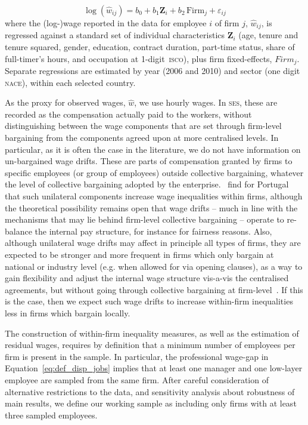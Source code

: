 \documentclass[12pt]{article}
\begin{document}
\begin{equation}
\label{eq:mincer}
\log \left( \hat{w}_{ij} \right) = 
    b_0 + b_1 \bm{Z}_{i} + b_2\, \mathrm{Firm}_j + \varepsilon_{ij}
\end{equation}
where the (log-)wage reported in the data for employee $i$ of firm
$j$, $\hat{w}_{ij}$, is regressed against a standard set of individual
characteristics $\bm{Z}_{i}$ (age, tenure and tenure squared, gender,
education, contract duration, part-time status, share of full-timer's
hours, and occupation at 1-digit~\textsc{isco}), plus firm
fixed-effects, $Firm_j$. Separate regressions are estimated
by year (2006 and 2010) and sector (one digit \textsc{nace}), within
each selected country.

As the proxy for observed wages, $\hat{w}$, we use hourly wages. In
\textsc{ses}, these are recorded as the compensation actually paid to
the workers, without distinguishing between the wage components that
are set through firm-level bargaining from the components agreed upon
at more centralised levels. In particular, as it is often the case in
the literature, we do not have information on un-bargained wage
drifts. These are parts of compensation granted by firms to specific
employees (or group of employees) outside collective bargaining,
whatever the level of collective bargaining adopted by the
enterprise.~\cite{cardoso.portugal.2005} find for Portugal that such
unilateral components increase wage inequalities within firms,
although the theoretical possibility remains open that wage drifts --
much in line with the mechanisms that may lie behind firm-level
collective bargaining -- operate to re-balance the internal pay
structure, for instance for fairness reasons. Also, although
unilateral wage drifts may affect in principle all types of firms,
they are expected to be stronger and more frequent in firms which only
bargain at national or industry level (e.g. when allowed for via
opening clauses), as a way to gain flexibility and adjust the internal
wage structure vis-a-vis the centralised agreements, but without going
through collective bargaining at
firm-level~\citep{dellaringa.pagani.2007}. If this is the case, then
we expect such wage drifts to increase within-firm inequalities less
in firms which bargain locally.


The construction of within-firm inequality measures, as well as the
estimation of residual wages, requires by definition that a minimum
number of employees per firm is present in the sample. In particular,
the professional wage-gap in Equation~\ref{eq:def_disp_jobs} implies
that at least one manager and one low-layer employee are sampled
from the same firm. After careful consideration of alternative
restrictions to the data, and sensitivity analysis about robustness of
main results, we define our working sample as including only firms
with at least three sampled employees.\\
\end{document}
